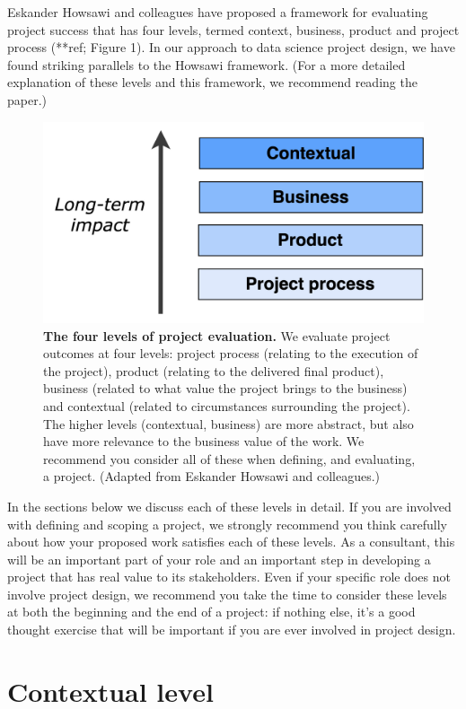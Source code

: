\documentclass[
]{book}
\begin{document}
Eskander Howsawi and colleagues have proposed a framework for evaluating project success that has four levels, termed context, business, product and project process (**ref; Figure 1). In our approach to data science project design, we have found striking parallels to the Howsawi framework. (For a more detailed explanation of these levels and this framework, we recommend reading the paper.)



\begin{figure}
\includegraphics[width=0.7\linewidth]{figures/Figure_1-eval_levels} \caption{\textbf{The four levels of project evaluation.} We evaluate project outcomes at four levels: project process (relating to the execution of the project), product (relating to the delivered final product), business (related to what value the project brings to the business) and contextual (related to circumstances surrounding the project). The higher levels (contextual, business) are more abstract, but also have more relevance to the business value of the work. We recommend you consider all of these when defining, and evaluating, a project. (Adapted from Eskander Howsawi and colleagues.)}\label{fig:eval-levels}
\end{figure}

In the sections below we discuss each of these levels in detail. If you are involved with defining and scoping a project, we strongly recommend you think carefully about how your proposed work satisfies each of these levels. As a consultant, this will be an important part of your role and an important step in developing a project that has real value to its stakeholders. Even if your specific role does not involve project design, we recommend you take the time to consider these levels at both the beginning and the end of a project: if nothing else, it's a good thought exercise that will be important if you are ever involved in project design.

\hypertarget{contextual-level}{%
\section{Contextual level}\label{contextual-level}}
\end{document}

